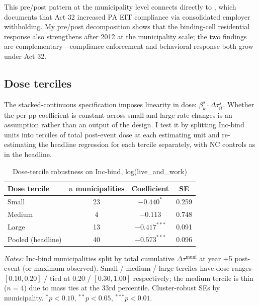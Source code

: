 \documentclass[12pt]{article}
\begin{document}
This pre/post pattern at the municipality level connects directly to \citet{bagchiEffectsIntroducingWithholding2022}, which documents that Act 32
increased PA EIT compliance via consolidated employer withholding.
My pre/post decomposition shows that the binding-cell residential
response also strengthens after 2012 at the municipality scale; the
two findings are complementary---compliance enforcement and behavioral
response both grow under Act 32.

\subsection{Dose terciles}
\label{app:rob-dose-tercile}

The stacked-continuous specification imposes linearity in dose:
$\beta^s_k \cdot \Delta\tau^s_{it}$. Whether the per-pp coefficient is
constant across small and large rate changes is an assumption rather
than an output of the design. I test it by splitting Inc-bind units
into terciles of total post-event dose at each estimating unit and
re-estimating the headline regression for each tercile separately,
with NC controls as in the headline.







\begin{table}[H]
    \centering
    \caption{Dose-tercile robustness on Inc-bind, log(live\_and\_work)}
    \label{tab:rob-tercile}
    \small
    \begin{tabular}{lccc}
        \toprule
        Dose tercile & $n$ municipalities & Coefficient & SE \\
        \midrule
        Small  & 23 & $-0.440^{*}$  & 0.259 \\
        Medium &  4 & $-0.113$       & 0.748 \\
        Large  & 13 & $-0.417^{***}$ & 0.091 \\
        \midrule
        Pooled (headline) & 40 & $-0.573^{***}$ & 0.096 \\
        \bottomrule
    \end{tabular}
    \vspace{0.3em}
    \begin{minipage}{0.85\textwidth}
        \footnotesize \textit{Notes:} Inc-bind municipalities split by total
        cumulative $\Delta\tau^{\text{muni}}$ at year +5 post-event
        (or maximum observed). Small / medium / large terciles have
        dose ranges $[0.10, 0.20]$ / tied at $0.20$ / $[0.30, 1.00]$
        respectively; the medium tercile is thin ($n=4$) due to mass
        ties at the 33rd percentile. Cluster-robust SEs by municipality.
        $^{*}p<0.10$, $^{**}p<0.05$, $^{***}p<0.01$.
    \end{minipage}
\end{table}
\end{document}
